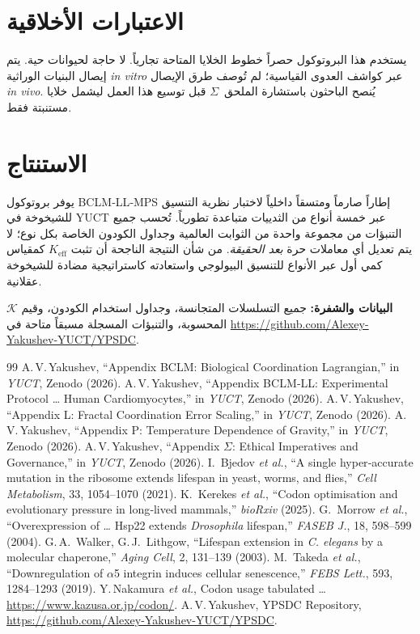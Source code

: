 \documentclass[11pt,a4paper]{article}
\newcommand{\REL}{\mathcal{K}}          %
\begin{document}
	\section{الاعتبارات الأخلاقية}
	\label{sec:ethics}
	يستخدم هذا البروتوكول حصراً خطوط الخلايا المتاحة تجارياً. لا حاجة لحيوانات حية. يتم إيصال البنيات الوراثية \textit{in vitro} عبر كواشف العدوى القياسية؛ لم تُوصف طرق الإيصال \textit{in vivo}. يُنصح الباحثون باستشارة الملحق~\(\Sigma\) قبل توسيع هذا العمل ليشمل خلايا مستنبتة فقط.
	
	\section{الاستنتاج}
	\label{sec:conclusion}
	يوفر بروتوكول BCLM‑LL‑MPS إطاراً صارماً ومتسقاً داخلياً لاختبار نظرية التنسيق للشيخوخة في YUCT عبر خمسة أنواع من الثدييات متباعدة تطورياً. تُحسب جميع التنبؤات من مجموعة واحدة من الثوابت العالمية وجداول الكودون الخاصة بكل نوع؛ لا يتم تعديل أي معاملات حرة \textit{بعد الحقيقة}. من شأن النتيجة الناجحة أن تثبت \(K_{\mathrm{eff}}\) كمقياس كمي أول عبر الأنواع للتنسيق البيولوجي واستعادته كاستراتيجية مضادة للشيخوخة عقلانية.
	
	\vspace{0.5cm}
	\noindent\textbf{البيانات والشفرة:} جميع التسلسلات المتجانسة، وجداول استخدام الكودون، وقيم \(\REL\) المحسوبة، والتنبؤات المسجلة مسبقاً متاحة في \url{https://github.com/Alexey-Yakushev-YUCT/YPSDC}.
	
	\begin{thebibliography}{99}
		 A.\,V.\,Yakushev, ``Appendix BCLM: Biological Coordination Lagrangian,'' in \emph{YUCT}, Zenodo (2026).
		 A.\,V.\,Yakushev, ``Appendix BCLM‑LL: Experimental Protocol … Human Cardiomyocytes,'' in \emph{YUCT}, Zenodo (2026).
		 A.\,V.\,Yakushev, ``Appendix L: Fractal Coordination Error Scaling,'' in \emph{YUCT}, Zenodo (2026).
		 A.\,V.\,Yakushev, ``Appendix P: Temperature Dependence of Gravity,'' in \emph{YUCT}, Zenodo (2026).
		 A.\,V.\,Yakushev, ``Appendix \(\Sigma\): Ethical Imperatives and Governance,'' in \emph{YUCT}, Zenodo (2026).
		 I.~Bjedov \emph{et al.}, ``A single hyper‑accurate mutation in the ribosome extends lifespan in yeast, worms, and flies,'' \emph{Cell Metabolism}, 33, 1054–1070 (2021).
		 K.~Kerekes \emph{et al.}, ``Codon optimisation and evolutionary pressure in long‑lived mammals,'' \emph{bioRxiv} (2025).
		 G.~Morrow \emph{et al.}, ``Overexpression of … Hsp22 extends \textit{Drosophila} lifespan,'' \emph{FASEB J.}, 18, 598–599 (2004).
		 G.\,A.~Walker, G.\,J.~Lithgow, ``Lifespan extension in \textit{C. elegans} by a molecular chaperone,'' \emph{Aging Cell}, 2, 131–139 (2003).
		 M.~Takeda \emph{et al.}, ``Downregulation of \(\alpha\)5 integrin induces cellular senescence,'' \emph{FEBS Lett.}, 593, 1284–1293 (2019).
		 Y.\,Nakamura \emph{et al.}, Codon usage tabulated … \url{https://www.kazusa.or.jp/codon/}.
		 A.\,V.\,Yakushev, YPSDC Repository, \url{https://github.com/Alexey-Yakushev-YUCT/YPSDC}.
	\end{thebibliography}
	
\end{document}
